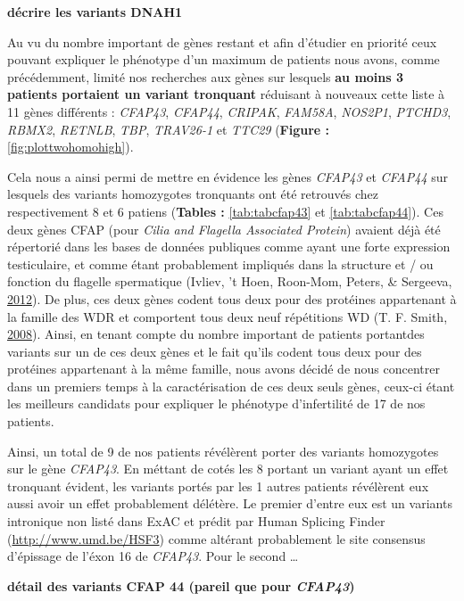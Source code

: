 \documentclass[12pt,twoside]{reedthesis}
\theoremstyle{definition}
\theoremstyle{definition}
\theoremstyle{remark}
\begin{document}
  \textbf{décrire les variants DNAH1}
  
  Au vu du nombre important de gènes restant et afin d'étudier en priorité
  ceux pouvant expliquer le phénotype d'un maximum de patients nous avons,
  comme précédemment, limité nos recherches aux gènes sur lesquels
  \textbf{au moins 3 patients portaient un variant tronquant} réduisant à
  nouveaux cette liste à 11 gènes différents : \emph{CFAP43},
  \emph{CFAP44}, \emph{CRIPAK}, \emph{FAM58A}, \emph{NOS2P1},
  \emph{PTCHD3}, \emph{RBMX2}, \emph{RETNLB}, \emph{TBP}, \emph{TRAV26-1}
  et \emph{TTC29} (\textbf{Figure : }\ref{fig:plottwohomohigh}).
  
  Cela nous a ainsi permi de mettre en évidence les gènes \emph{CFAP43} et
  \emph{CFAP44} sur lesquels des variants homozygotes tronquants ont été
  retrouvés chez respectivement 8 et 6 patiens (\textbf{Tables :
  }\ref{tab:tabcfap43} et \ref{tab:tabcfap44}). Ces deux gènes CFAP (pour
  \emph{Cilia and Flagella Associated Protein}) avaient déjà été
  répertorié dans les bases de données publiques comme ayant une forte
  expression testiculaire, et comme étant probablement impliqués dans la
  structure et / ou fonction du flagelle spermatique (Ivliev, 't Hoen,
  Roon-Mom, Peters, \& Sergeeva,
  \protect\hyperlink{ref-Ivliev2012}{2012}). De plus, ces deux gènes
  codent tous deux pour des protéines appartenant à la famille des WDR et
  comportent tous deux neuf répétitions WD (T. F. Smith,
  \protect\hyperlink{ref-Smith2008}{2008}). Ainsi, en tenant compte du
  nombre important de patients portantdes variants sur un de ces deux
  gènes et le fait qu'ils codent tous deux pour des protéines appartenant
  à la même famille, nous avons décidé de nous concentrer dans un premiers
  temps à la caractérisation de ces deux seuls gènes, ceux-ci étant les
  meilleurs candidats pour expliquer le phénotype d'infertilité de 17 de
  nos patients.
  
  Ainsi, un total de 9 de nos patients révélèrent porter des variants
  homozygotes sur le gène \emph{CFAP43}. En méttant de cotés les 8 portant
  un variant ayant un effet tronquant évident, les variants portés par les
  1 autres patients révélèrent eux aussi avoir un effet probablement
  délétère. Le premier d'entre eux est un variants intronique non listé
  dans ExAC et prédit par Human Splicing Finder
  (\url{http://www.umd.be/HSF3}) comme altérant probablement le site
  consensus d'épissage de l'éxon 16 de \emph{CFAP43}. Pour le second
  \ldots{}
  
  \textbf{détail des variants CFAP 44 (pareil que pour \emph{CFAP43})}
  
\end{document}
